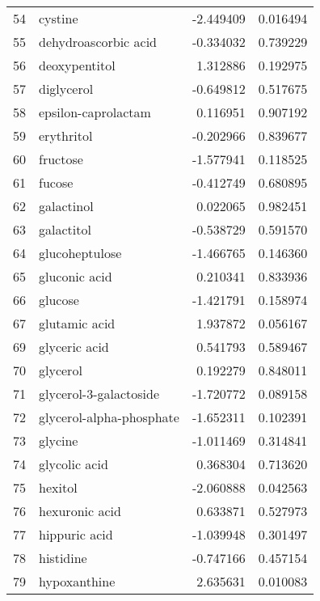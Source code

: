 \begin{tabular}{llrr}
54  &                            cystine & -2.449409 &  0.016494 \\
55  &               dehydroascorbic acid & -0.334032 &  0.739229 \\
56  &                      deoxypentitol &  1.312886 &  0.192975 \\
57  &                         diglycerol & -0.649812 &  0.517675 \\
58  &                epsilon-caprolactam &  0.116951 &  0.907192 \\
59  &                         erythritol & -0.202966 &  0.839677 \\
60  &                           fructose & -1.577941 &  0.118525 \\
61  &                             fucose & -0.412749 &  0.680895 \\
62  &                         galactinol &  0.022065 &  0.982451 \\
63  &                         galactitol & -0.538729 &  0.591570 \\
64  &                     glucoheptulose & -1.466765 &  0.146360 \\
65  &                      gluconic acid &  0.210341 &  0.833936 \\
66  &                            glucose & -1.421791 &  0.158974 \\
67  &                      glutamic acid &  1.937872 &  0.056167 \\
69  &                      glyceric acid &  0.541793 &  0.589467 \\
70  &                           glycerol &  0.192279 &  0.848011 \\
71  &             glycerol-3-galactoside & -1.720772 &  0.089158 \\
72  &           glycerol-alpha-phosphate & -1.652311 &  0.102391 \\
73  &                            glycine & -1.011469 &  0.314841 \\
74  &                      glycolic acid &  0.368304 &  0.713620 \\
75  &                            hexitol & -2.060888 &  0.042563 \\
76  &                     hexuronic acid &  0.633871 &  0.527973 \\
77  &                      hippuric acid & -1.039948 &  0.301497 \\
78  &                          histidine & -0.747166 &  0.457154 \\
79  &                       hypoxanthine &  2.635631 &  0.010083 \\

\end{tabular}
